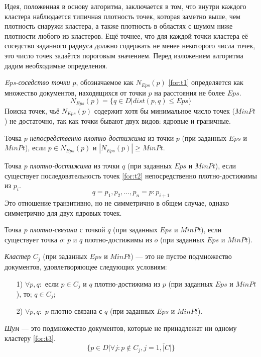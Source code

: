 Идея, положенная в основу алгоритма, заключается в том, что внутри каждого кластера наблюдается типичная плотность точек, которая заметно выше, чем плотность снаружи кластера, а также плотность в областях с шумом ниже плотности любого из кластеров.
Ещё точнее, что для каждой точки кластера её соседство заданного радиуса должно содержать не менее некоторого числа точек, это число точек задаётся пороговым значением. Перед изложением алгоритма дадим необходимые определения.

\textit{Eps-соседство точки $p$}, обозначаемое как $N_{Eps}(p)$ \ref{for:t1} определяется как множество документов, находящихся от точки $p$ на расстояния не более $Eps$.
\begin{equation}
\label{for:t1}
 N_{Eps}(p) = \{q \in D | dist(p, q) \leq Eps\}
\end{equation}
Поиска точек, чьё $N_{Eps}(p)$ содержит хотя бы минимальное число точек ($MinPt$) не достаточно, так как точки бывают двух видов: ядровые и граничные.

Точка $p$ \textit{непосредственно плотно-достижима} из точки $p$ (при заданных $Eps$ и $MinPt$), если
$p \in N_{Eps}(p)$ и $|N_{Eps}(p)| \geq MinPt$.

Точка $p$ \textit{плотно-достижима} из точки $q$ (при заданных $Eps$ и $MinPt$), если существует последовательность точек \ref{for:t2} непосредственно плотно-достижимы из $p_i$.
\begin{equation}
\label{for:t2}
	q = p_1, p_2, \ldots, p_n = p: p_{i+1}
\end{equation}
Это отношение транзитивно, но не симметрично в общем случае, однако симметрично для двух ядровых точек.

Точка $p$ \textit{плотно-связана} с точкой $q$ (при заданных $Eps$ и $MinPt$), если существует точка $o$: $p$ и $q$ плотно-достижимы из $o$ (при заданных $Eps$ и $MinPt$).

\textit{Кластер} $C_j$ (при заданных $Eps$ и $MinPt$) --- это не пустое подмножество документов, удовлетворяющее следующих условиям:
\begin{enumerate}
	\item[1)] $\forall p, q:$ если $p \in C_j$ и $q$ плотно-достижима из $p$ (при заданных $Eps$ и $MinPt$), то; $q \in C_j$;
	\item[2)] $\forall p, q:$ $p$ плотно-связана с $q$ (при заданных $Eps$ и $MinPt$).
\end{enumerate}

\textit{Шум} --- это подмножество документов, которые не принадлежат ни одному кластеру \ref{for:t3}.
\begin{equation}
\label{for:t3}
	\{p \in D | \forall j: p \notin C_j, j = \overline{1, |C|}\}
\end{equation}

